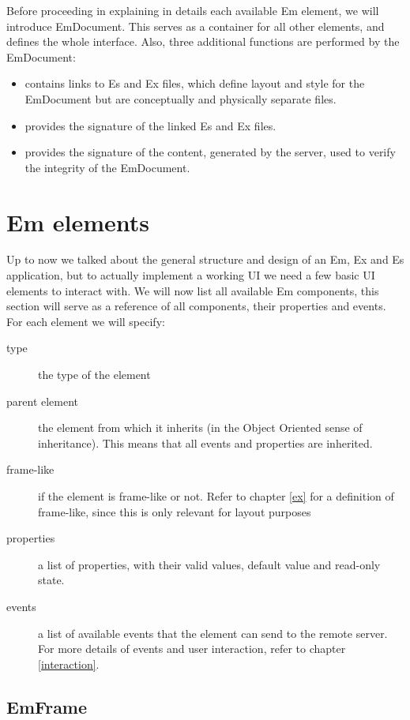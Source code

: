 Before proceeding in explaining in details each available Em element, we will introduce EmDocument. This serves as a container for all other elements, and defines the whole interface. Also, three additional functions are performed by the EmDocument:

\begin{itemize}
    \item contains links to Es and Ex files, which define layout and style for the EmDocument but are conceptually and physically separate files.
    \item provides the signature of the linked Es and Ex files.
    \item provides the signature of the content, generated by the server, used to verify the integrity of the EmDocument.
\end{itemize}

\section{Em elements}
\label{sec:em_elements}

Up to now we talked about the general structure and design of an Em, Ex and Es application, but to actually implement a working UI we need a few basic UI elements to interact with. We will now list all available Em components, this section will serve as a reference of all components, their properties and events. For each element we will specify:

\begin{description}
    \item [type] the type of the element
    \item [parent element] the element from which it inherits (in the Object Oriented sense of inheritance). This means that all events and properties are inherited.
    \item [frame-like] if the element is frame-like or not. Refer to chapter \ref{ex} for a definition of frame-like, since this is only relevant for layout purposes
    \item [properties] a list of properties, with their valid values, default value and read-only state.
    \item [events] a list of available events that the element can send to the remote server. For more details of events and user interaction, refer to chapter \ref{interaction}.
\end{description}

\subsection{EmFrame}
\label{sec:emframe}


